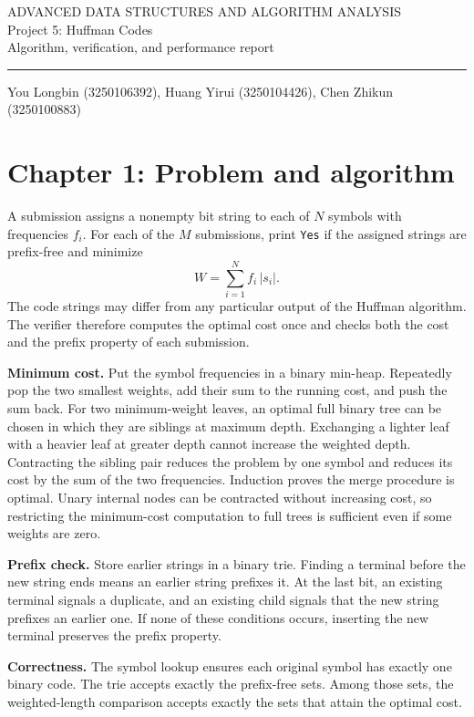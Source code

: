 \documentclass[11pt,a4paper]{article}
\begin{document}
\begin{center}
{\small ADVANCED DATA STRUCTURES AND ALGORITHM ANALYSIS}\\[6pt]
{\LARGE Project 5: Huffman Codes}\\[5pt]
{\large Algorithm, verification, and performance report}
\end{center}
\hrule
\vspace{7pt}

{\small You Longbin (3250106392), Huang Yirui (3250104426), Chen Zhikun (3250100883)}

\section{Chapter 1: Problem and algorithm}
A submission assigns a nonempty bit string to each of $N$ symbols with frequencies $f_i$. For each of the $M$ submissions, print \texttt{Yes} if the assigned strings are prefix-free and minimize
\[
W=\sum_{i=1}^{N}f_i\,|s_i|.
\]
The code strings may differ from any particular output of the Huffman algorithm. The verifier therefore computes the optimal cost once and checks both the cost and the prefix property of each submission.

\textbf{Minimum cost.} Put the symbol frequencies in a binary min-heap. Repeatedly pop the two smallest weights, add their sum to the running cost, and push the sum back. For two minimum-weight leaves, an optimal full binary tree can be chosen in which they are siblings at maximum depth. Exchanging a lighter leaf with a heavier leaf at greater depth cannot increase the weighted depth. Contracting the sibling pair reduces the problem by one symbol and reduces its cost by the sum of the two frequencies. Induction proves the merge procedure is optimal. Unary internal nodes can be contracted without increasing cost, so restricting the minimum-cost computation to full trees is sufficient even if some weights are zero.

\textbf{Prefix check.} Store earlier strings in a binary trie. Finding a terminal before the new string ends means an earlier string prefixes it. At the last bit, an existing terminal signals a duplicate, and an existing child signals that the new string prefixes an earlier one. If none of these conditions occurs, inserting the new terminal preserves the prefix property.

\textbf{Correctness.} The symbol lookup ensures each original symbol has exactly one binary code. The trie accepts exactly the prefix-free sets. Among those sets, the weighted-length comparison accepts exactly the sets that attain the optimal cost.
\end{document}
